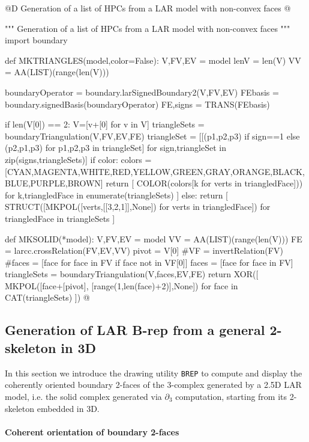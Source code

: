 \documentclass[11pt,oneside]{article}    %
\begin{document}
@D Generation of a list of HPCs from a LAR model with non-convex faces
@{""" Generation of a list of HPCs from a LAR model with non-convex faces """
import boundary

def MKTRIANGLES(model,color=False):
    V,FV,EV = model
    lenV = len(V)
    VV = AA(LIST)(range(len(V)))
    
    boundaryOperator = boundary.larSignedBoundary2(V,FV,EV)
    FEbasis = boundary.signedBasis(boundaryOperator)
    FE,signs = TRANS(FEbasis)
    
    if len(V[0]) == 2: V=[v+[0] for v in V]
    triangleSets = boundaryTriangulation(V,FV,EV,FE)
    triangleSet = [[(p1,p2,p3) if sign==1 else (p2,p1,p3) for p1,p2,p3 in triangleSet] 
                    for sign,triangleSet in zip(signs,triangleSets)]
    if color:
        colors = [CYAN,MAGENTA,WHITE,RED,YELLOW,GREEN,GRAY,ORANGE,BLACK,BLUE,PURPLE,BROWN]
        return [ COLOR(colors[k%
            for verts in triangledFace])) for k,triangledFace in enumerate(triangleSets) ]
    else:
        return [ STRUCT([MKPOL([verts,[[3,2,1]],None]) for verts in triangledFace])
                for triangledFace in triangleSets ]

def MKSOLID(*model): 
    V,FV,EV = model
    VV = AA(LIST)(range(len(V)))
    FE = larcc.crossRelation(FV,EV,VV)
    pivot = V[0]
    #VF = invertRelation(FV) 
    #faces = [face for face in FV if face not in VF[0]]
    faces = [face for face in FV]
    triangleSets = boundaryTriangulation(V,faces,EV,FE)
    return XOR([ MKPOL([face+[pivot], [range(1,len(face)+2)],None])
        for face in CAT(triangleSets) ])
@}


\subsection{Generation of LAR B-rep from a general 2-skeleton in 3D}

In this section we introduce the drawing utility \texttt{BREP} to compute and display the coherently oriented boundary 2-faces of the 3-complex generated by a 2.5D LAR model, i.e. the solid complex generated via $\partial_3$ computation, starting from its 2-skeleton embedded in 3D.

\paragraph{Coherent orientation of boundary 2-faces}
\end{document}
